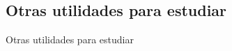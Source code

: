 \documentclass[../slides.tex]{subfiles}
\begin{document}
    \subsection{Otras utilidades para estudiar}
    
    \begin{frame}{Otras utilidades para estudiar}
    \end{frame}
    
\end{document}
